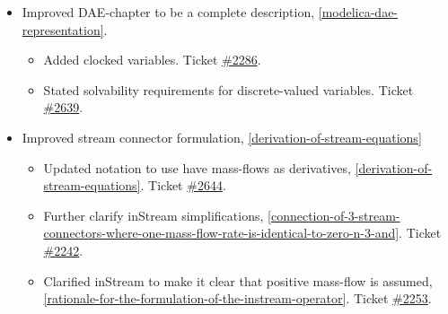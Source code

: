 \begin{itemize}
\item Improved DAE-chapter to be a complete description, \cref{modelica-dae-representation}.
\begin{itemize}
\item Added clocked variables.
Ticket \href{https://github.com/modelica/ModelicaSpecification/issues/2286}{\#2286}.
\item Stated solvability requirements for discrete-valued variables.
Ticket \href{https://github.com/modelica/ModelicaSpecification/issues/2639}{\#2639}.
\end{itemize}

\item Improved stream connector formulation, \cref{derivation-of-stream-equations}
\begin{itemize}
\item Updated notation to use have mass-flows as derivatives, \cref{derivation-of-stream-equations}.
Ticket \href{https://github.com/modelica/ModelicaSpecification/issues/2644}{\#2644}.
\item Further clarify inStream simplifications, \cref{connection-of-3-stream-connectors-where-one-mass-flow-rate-is-identical-to-zero-n-3-and}.
Ticket \href{https://github.com/modelica/ModelicaSpecification/issues/2242}{\#2242}.
\item Clarified inStream to make it clear that positive mass-flow is assumed, \cref{rationale-for-the-formulation-of-the-instream-operator}.
Ticket \href{https://github.com/modelica/ModelicaSpecification/issues/2253}{\#2253}.
\end{itemize}



\end{itemize}
